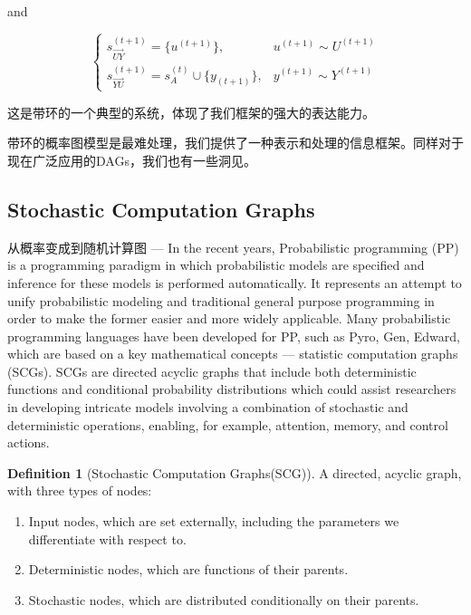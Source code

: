 \documentclass{article}
\theoremstyle{definition}
\newtheorem{definition}{Definition}[section]
\theoremstyle{remark}
\theoremstyle{definition}
\begin{document}
\begin{CJK*}{UTF8}{gbsn}
and 

\begin{equation} \label{eq:collect}
\left\{
     \begin{array}{lr}
     s^{(t+1)}_{\vec{UY}} = \{u^{(t+1)}\}, & u^{(t+1)} \sim U^{(t+1)} \\
     s^{(t+1)}_{\vec{YU}} = s^{(t)}_A \cup \{y_{(t+1)}\}, & y^{(t+1)} \sim Y^{(t+1)}  
     \end{array}
\right.
\end{equation}

这是带环的一个典型的系统，体现了我们框架的强大的表达能力。

带环的概率图模型是最难处理，我们提供了一种表示和处理的信息框架。同样对于现在广泛应用的DAGs，我们也有一些洞见。

\subsection{Stochastic Computation Graphs}

从概率变成到随机计算图 ---
In the recent years, Probabilistic programming (PP) is a programming paradigm in which probabilistic models are specified and inference for these models is performed automatically. It represents an attempt to unify probabilistic modeling and traditional general purpose programming in order to make the former easier and more widely applicable. Many probabilistic programming languages have been developed for PP, such as Pyro, Gen, Edward, which are based on a key mathematical concepts --- statistic computation graphs (SCGs). SCGs are directed acyclic graphs that include both deterministic functions and conditional probability distributions which could assist researchers in developing intricate models involving a combination of stochastic and deterministic operations, enabling, for example, attention, memory, and control actions.  

\begin{definition}[Stochastic Computation Graphs(SCG)]
A directed, acyclic graph, with three types of nodes:
\begin{enumerate}[(1)]
    \setlength\itemsep{-0.5em}
    \item Input nodes, which are set externally, including the parameters we differentiate with respect to.
    \item Deterministic nodes, which are functions of their parents.
    \item Stochastic nodes, which are distributed conditionally on their parents.
\end{enumerate}


\end{definition}
\end{CJK*}
\end{document}
